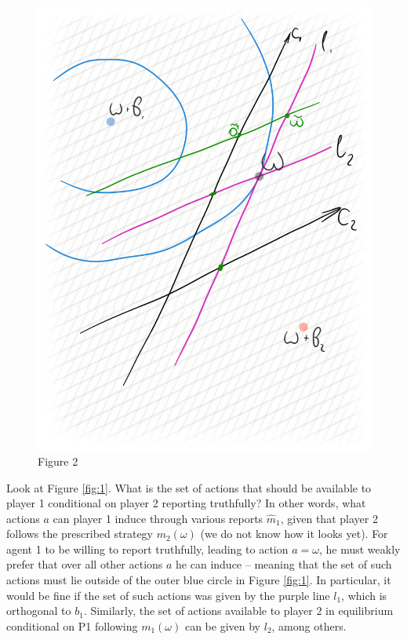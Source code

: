 \documentclass{article}
\begin{document}
\begin{figure}[b!]
{		\includegraphics[scale=0.25]{pics/M4/battaglini04.png}
		\caption{Figure 2}
		\label{fig:2}
	}
\end{figure}

Look at Figure \ref{fig:1}. What is the set of actions that should be available to player 1 conditional on player 2 reporting truthfully? In other words, what actions $a$ can player 1 induce through various reports $\hat{m}_1$, given that player 2 follows the prescribed strategy $m_2(\omega)$ (we do not know how it looks yet). For agent 1 to be willing to report truthfully, leading to action $a=\omega$, he must weakly prefer that over all other actions $a$ he can induce -- meaning that the set of such actions must lie outside of the outer blue circle in Figure \ref{fig:1}. In particular, it would be fine if the set of such actions was given by the purple line $l_1$, which is orthogonal to $b_1$. Similarly, the set of actions available to player 2 in equilibrium conditional on P1 following $m_1(\omega)$ can be given by $l_2$, among others.
\end{document}
